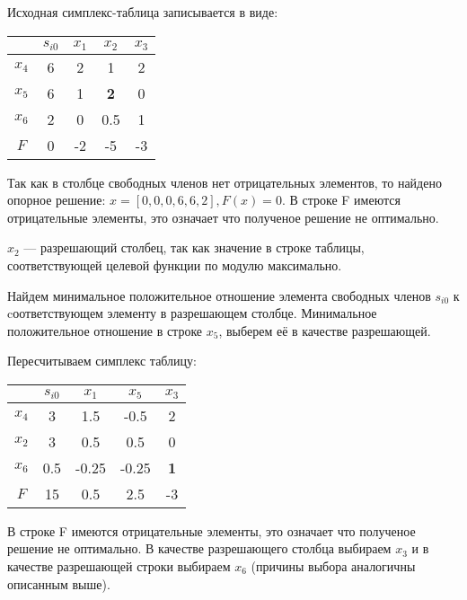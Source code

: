 \documentclass[12pt,a4paper,oneside]{extarticle}
\begin{document}
    Исходная симплекс-таблица записывается в виде:
    \begin{center}
        \begin{tabular}{|c|c|c|c|c|}
            \hline
                 & $s_{i0}$ & $x_1$ & $x_2$ & $x_3$ \\ \hline
            $x_4$ & 6       & 2     & 1     & 2 \\ \hline
            $x_5$ & 6       & 1     &{\bf 2}& 0 \\ \hline
            $x_6$ & 2       & 0     & 0.5   & 1 \\ \hline
            $F$   & 0       & -2    & -5    & -3 \\ \hline
        \end{tabular}
    \end{center}

    Так как в столбце свободных членов нет отрицательных элементов, то найдено опорное решение: $x=[0, 0, 0, 6, 6, 2], F(x)=0$. В строке F имеются отрицательные элементы, это означает что полученое решение не оптимально.

    $x_2$ --- разрешающий столбец, так как значение в строке таблицы, соответствующей целевой функции по модулю максимально.

    Найдем минимальное положительное отношение элемента свободных членов $s_{i0}$ к cоответствующем элементу в разрешающем столбце. Минимальное положительное отношение в строке $x_5$, выберем её в качестве разрешающей.

    Пересчитываем симплекс таблицу:
    \begin{center}
        \begin{tabular}{|c|c|c|c|c|}
            \hline
                 & $s_{i0}$ & $x_1$ & $x_5$ & $x_3$ \\ \hline
            $x_4$ & 3       & 1.5   & -0.5  & 2  \\ \hline
            $x_2$ & 3       & 0.5   & 0.5   & 0  \\ \hline
            $x_6$ & 0.5     & -0.25 & -0.25 &{\bf 1}\\ \hline
            $F$   & 15      & 0.5   & 2.5   & -3 \\ \hline
        \end{tabular}
    \end{center}

    В строке F имеются отрицательные элементы, это означает что полученое решение не оптимально.
    В качестве разрешающего столбца выбираем $x_3$ и в качестве разрешающей строки выбираем $x_6$ (причины выбора аналогичны описанным выше).
\end{document}
